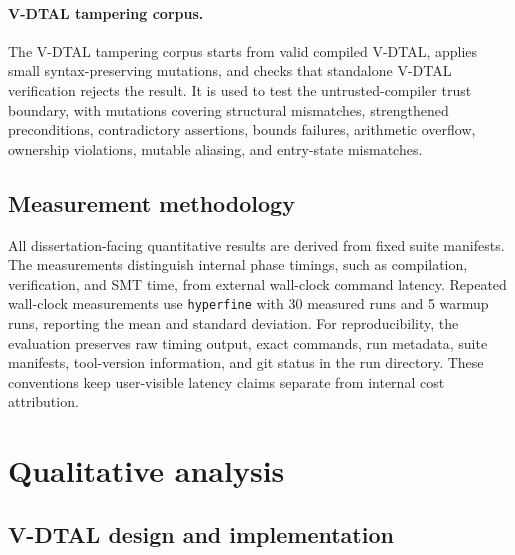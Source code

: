 \paragraph{V-DTAL tampering corpus.}
The V-DTAL tampering corpus starts from valid compiled V-DTAL, applies small syntax-preserving mutations, and checks that standalone V-DTAL verification rejects the result. It is used to test the untrusted-compiler trust boundary, with mutations covering structural mismatches, strengthened preconditions, contradictory assertions, bounds failures, arithmetic overflow, ownership violations, mutable aliasing, and entry-state mismatches. %

\subsection{Measurement methodology}

All dissertation-facing quantitative results are derived from fixed suite manifests. The measurements distinguish internal phase timings, such as compilation, verification, and SMT time, from external wall-clock command latency. Repeated wall-clock measurements use \texttt{hyperfine} with 30 measured runs and 5 warmup runs, reporting the mean and standard deviation. For reproducibility, the evaluation preserves raw timing output, exact commands, run metadata, suite manifests, tool-version information, and git status in the run directory. These conventions keep user-visible latency claims separate from internal cost attribution. %

%

\section{Qualitative analysis}\label{sec:qualitative-analysis}

\subsection{V-DTAL design and implementation}\label{sec:dtal-eval}

